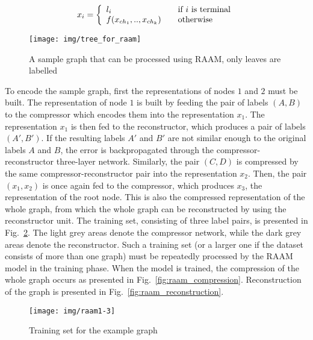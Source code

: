 \begin{equation}
x_i = \left\{
\begin{array}{l l}
	l_i & \quad \text{if $i$ is terminal} \\
	f(x_{ch_1}, .., x_{ch_k}) & \quad \text{otherwise}
\end{array}
\right.
\label{eq:raam_representation}
\end{equation}

\begin{figure}
\begin{center}
	\texttt{[image: img/tree\_for\_raam]}
	\caption{A sample graph that can be processed using RAAM, only leaves are labelled}
	\label{fig:tree_for_raam}
\end{center}
\end{figure}

To encode the sample graph, first the representations of nodes $1$ and $2$ must be built. The representation of node $1$ is built by feeding the pair of labels $(A, B)$ to the compressor which encodes them into the representation $x_1$. The representation $x_1$ is then fed to the reconstructor, which produces a pair of labels $(A', B')$. If the resulting labels $A'$ and $B'$ are not similar enough to the original labels $A$ and $B$, the error is backpropagated through the compressor-reconstructor three-layer network. Similarly, the pair $(C, D)$ is compressed by the same compressor-reconstructor pair into the representation $x_2$. Then, the pair $(x_1, x_2)$ is once again fed to the compressor, which produces $x_3$, the representation of the root node. This is also the compressed representation of the whole graph, from which the whole graph can be reconstructed by using the reconstructor unit. The training set, consisting of three label pairs, is presented in Fig.~\ref{fig:raam1-3}. The light grey areas denote the compressor network, while the dark grey areas denote the reconstructor. Such a training set (or a larger one if the dataset consists of more than one graph) must be repeatedly processed by the RAAM model in the training phase. When the model is trained, the compression of the whole graph occurs as presented in Fig.~\ref{fig:raam_compression}. Reconstruction of the graph is presented in Fig.~\ref{fig:raam_reconstruction}.

\begin{figure}
\begin{center}
	\texttt{[image: img/raam1-3]}
	\caption{Training set for the example graph}
	\label{fig:raam1-3}
\end{center}
\end{figure}


